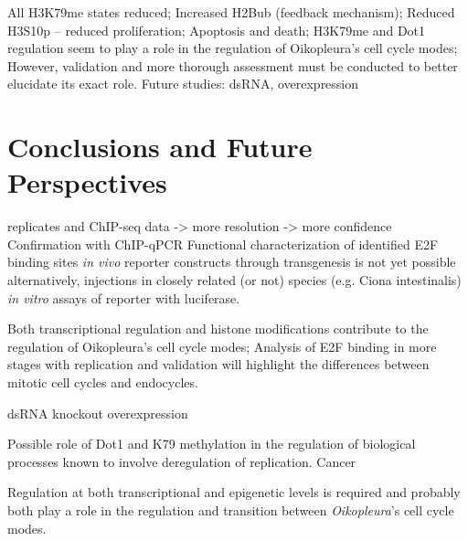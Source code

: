 \documentclass[11pt,twoside,a4paper]{report}
\begin{document}
All H3K79me states reduced;
Increased H2Bub (feedback mechanism);
Reduced H3S10p – reduced proliferation;
Apoptosis and death;
H3K79me and Dot1 regulation seem to play a role in the
regulation of Oikopleura's cell cycle modes;
However, validation and more thorough assessment must be
conducted to better elucidate its exact role.
Future studies: dsRNA, overexpression

\clearpage

\chapter{Conclusions and Future Perspectives}




replicates and ChIP-seq data -> more resolution -> more confidence 
Confirmation with ChIP-qPCR
Functional characterization of identified E2F binding sites 
\textit{in vivo} reporter constructs through transgenesis is not yet possible
alternatively,
injections in closely related (or not) species (e.g. Ciona intestinalis)
\textit{in vitro} assays of reporter with luciferase.


Both transcriptional regulation and histone modifications contribute to the regulation of Oikopleura's cell cycle modes;
Analysis of E2F binding in more stages with replication and validation will highlight the differences between mitotic cell cycles and endocycles.


dsRNA knockout
overexpression

Possible role of Dot1 and K79 methylation in the regulation of biological processes known to involve deregulation of replication. Cancer




Regulation at both transcriptional and epigenetic levels is required and probably both play a role in the regulation and transition between \textit{Oikopleura}'s cell cycle modes.



\cleardoublepage
%
%


\end{document}
